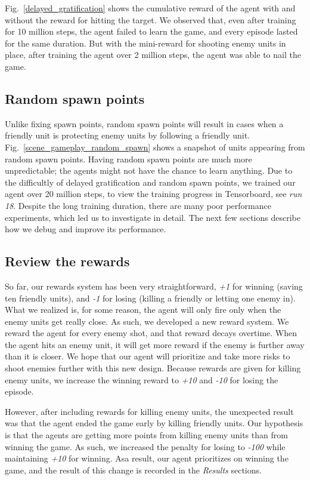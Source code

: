 \documentclass[conference]{IEEEtran}
\begin{document}
Fig.~\ref{delayed_gratification} shows the cumulative reward of the agent with and without the reward for hitting the target. We observed that, even after training for 10 million steps, the agent failed to learn the game, and every episode lasted for the same duration. But with the mini-reward for shooting enemy units in place, after training the agent over 2 million steps, the agent was able to nail the game. 

\subsection{Random spawn points}

Unlike fixing spawn points, random spawn points will result in cases when a friendly unit is protecting enemy units by following a friendly unit. Fig.~\ref{scene_gameplay_random_spawn} shows a snapshot of units appearing from random spawn points. Having random spawn points are much more unpredictable; the agents might not have the chance to learn anything. Due to the difficultly of delayed gratification and random spawn points, we trained our agent over 20 million steps, to view the training progress in Tensorboard, see \textit{run 18}. Despite the long training duration, there are many poor performance experiments, which led us to investigate in detail. The next few sections describe how we debug and improve its performance.

\subsection{Review the rewards}

So far, our rewards system has been very straightforward, \textit{+1} for winning (saving ten friendly units), and \textit{-1} for losing (killing a friendly or letting one enemy in). What we realized is, for some reason, the agent will only fire only when the enemy units get really close. As such, we developed a new reward system. We reward the agent for every enemy shot, and that reward decays overtime. When the agent hits an enemy unit, it will get more reward if the enemy is further away than it is closer. We hope that our agent will prioritize and take more risks to shoot enemies further with this new design. Because rewards are given for killing enemy units, we increase the winning reward to \textit{+10} and \textit{-10} for losing the episode. 

However, after including rewards for killing enemy units, the unexpected result was that the agent ended the game early by killing friendly units. Our hypothesis is that the agents are getting more points from killing enemy units than from winning the game. As such, we increased the penalty for losing to \textit{-100} while maintaining \textit{+10} for winning. Asa result, our agent prioritizes on winning the game, and the result of this change is recorded in the \textit{Results} sections.
\end{document}
